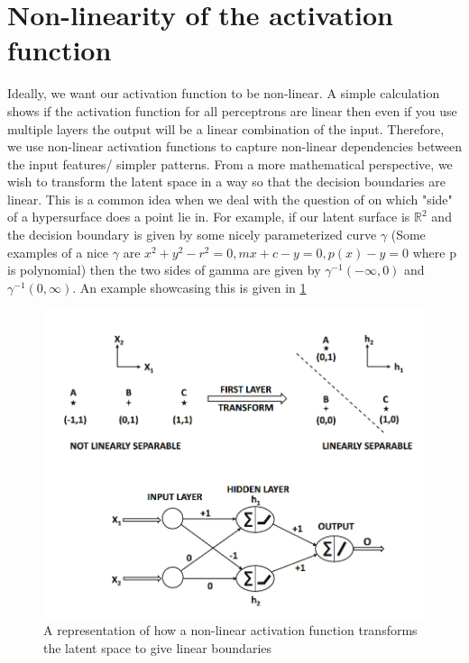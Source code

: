 \section{Non-linearity of the activation function}
Ideally, we want our activation function to be non-linear. A simple calculation shows if the activation function for all perceptrons are 
linear then even if you use multiple layers the output will be a linear combination of the input.
Therefore, we use non-linear activation functions to capture non-linear dependencies between the
input features/ simpler patterns. From a more mathematical perspective, we wish to transform the latent space in a way so that the decision boundaries are linear. This is a common idea when we deal with the question of on
which "side" of a hypersurface does a point lie in. For example, if our latent surface is $\mathbb R^2$ and
the decision boundary is given by some nicely parameterized curve $\gamma$ (Some examples of a
nice $\gamma$ are $x^2 + y^2 - r^2 = 0,mx + c - y = 0, p(x) - y = 0$ where p is polynomial) then the two
sides of gamma are given by $\gamma^{-1}(-\infty, 0)$ and $\gamma^{-1}(0, \infty)$. An example showcasing this is given
in \ref{non-linearity}
\begin{figure}
    \begin{center}
        \includegraphics[width=\textwidth]{graphics/non-linearity.png}
    \end{center}
    \caption{A representation of how a non-linear activation function transforms the latent space to give linear boundaries\citep{aggarwal2018neural}}\label{non-linearity}
\end{figure}
